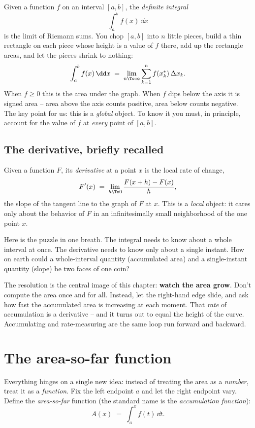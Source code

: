 Given a function $f$ on an interval $[a,b]$, the \emph{definite integral}
\[
  \int_a^b f(x)\,\dd x
\]
is the limit of Riemann sums. You chop $[a,b]$ into $n$ little pieces, build a
thin rectangle on each piece whose height is a value of $f$ there, add up the
rectangle areas, and let the pieces shrink to nothing:
\[
  \int_a^b f(x)\,\dd x \;=\; \lim_{n\To\infty}\sum_{k=1}^{n} f(x_k^*)\,\Delta x_k .
\]
When $f\ge 0$ this is the area under the graph. When $f$ dips below the axis it
is signed area -- area above the axis counts positive, area below counts
negative. The key point for us: this is a \emph{global} object. To know it you
must, in principle, account for the value of $f$ at \emph{every} point of
$[a,b]$.

\subsection{The derivative, briefly recalled}

Given a function $F$, its \emph{derivative} at a point $x$ is the local rate of
change,
\[
  F'(x) \;=\; \lim_{h\To 0}\frac{F(x+h)-F(x)}{h},
\]
the slope of the tangent line to the graph of $F$ at $x$. This is a
\emph{local} object: it cares only about the behavior of $F$ in an
infinitesimally small neighborhood of the one point $x$.

\begin{intuitionbox}
Here is the puzzle in one breath. The integral needs to know about a whole
interval at once. The derivative needs to know only about a single instant. How
on earth could a whole-interval quantity (accumulated area) and a single-instant
quantity (slope) be two faces of one coin?

The resolution is the central image of this chapter: \textbf{watch the area
grow}. Don't compute the area once and for all. Instead, let the right-hand edge
slide, and ask how fast the accumulated area is increasing at each moment. That
\emph{rate} of accumulation is a derivative -- and it turns out to equal the
height of the curve. Accumulating and rate-measuring are the same loop run
forward and backward.
\end{intuitionbox}

\section{The area-so-far function}

Everything hinges on a single new idea: instead of treating the area as a
\emph{number}, treat it as a \emph{function}. Fix the left endpoint $a$ and let
the right endpoint vary. Define the \emph{area-so-far} function (the standard
name is the \emph{accumulation function}):
\[
  A(x) \;=\; \int_a^x f(t)\,\dd t .
\]

